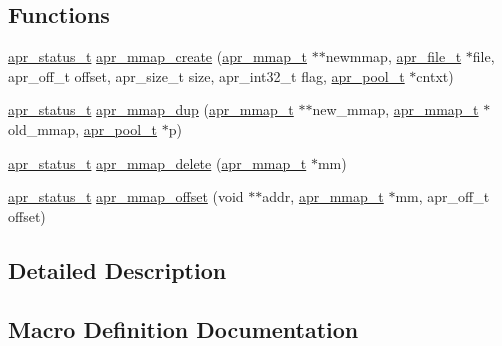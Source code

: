 \subsection*{Functions}
\begin{DoxyCompactItemize}
\item 
\hyperlink{group__apr__errno_gaf76ee4543247e9fb3f3546203e590a6c}{apr\+\_\+status\+\_\+t} \hyperlink{group__apr__mmap_gac6b103139be2e859741ec94cc6ad34cc}{apr\+\_\+mmap\+\_\+create} (\hyperlink{structapr__mmap__t}{apr\+\_\+mmap\+\_\+t} $\ast$$\ast$newmmap, \hyperlink{group__apr__file__io_gaa46e4763ac375ea3c7a43ba6f6099e22}{apr\+\_\+file\+\_\+t} $\ast$file, apr\+\_\+off\+\_\+t offset, apr\+\_\+size\+\_\+t size, apr\+\_\+int32\+\_\+t flag, \hyperlink{group__apr__pools_gaf137f28edcf9a086cd6bc36c20d7cdfb}{apr\+\_\+pool\+\_\+t} $\ast$cntxt)
\item 
\hyperlink{group__apr__errno_gaf76ee4543247e9fb3f3546203e590a6c}{apr\+\_\+status\+\_\+t} \hyperlink{group__apr__mmap_ga9fcdbf8090e924a4e8f2b301519bb4c8}{apr\+\_\+mmap\+\_\+dup} (\hyperlink{structapr__mmap__t}{apr\+\_\+mmap\+\_\+t} $\ast$$\ast$new\+\_\+mmap, \hyperlink{structapr__mmap__t}{apr\+\_\+mmap\+\_\+t} $\ast$old\+\_\+mmap, \hyperlink{group__apr__pools_gaf137f28edcf9a086cd6bc36c20d7cdfb}{apr\+\_\+pool\+\_\+t} $\ast$p)
\item 
\hyperlink{group__apr__errno_gaf76ee4543247e9fb3f3546203e590a6c}{apr\+\_\+status\+\_\+t} \hyperlink{group__apr__mmap_ga4b67a2d22a07707897cc1183a1682040}{apr\+\_\+mmap\+\_\+delete} (\hyperlink{structapr__mmap__t}{apr\+\_\+mmap\+\_\+t} $\ast$mm)
\item 
\hyperlink{group__apr__errno_gaf76ee4543247e9fb3f3546203e590a6c}{apr\+\_\+status\+\_\+t} \hyperlink{group__apr__mmap_ga4c1d31bd9e911744bd5edb97e17210ec}{apr\+\_\+mmap\+\_\+offset} (void $\ast$$\ast$addr, \hyperlink{structapr__mmap__t}{apr\+\_\+mmap\+\_\+t} $\ast$mm, apr\+\_\+off\+\_\+t offset)
\end{DoxyCompactItemize}


\subsection{Detailed Description}


\subsection{Macro Definition Documentation}
